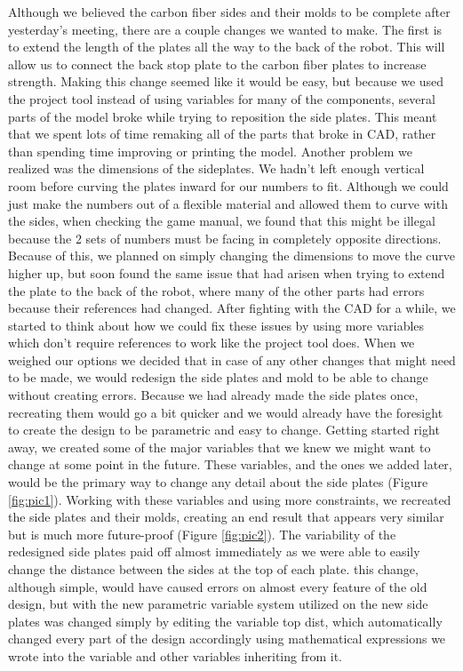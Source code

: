 Although we believed the carbon fiber sides and their molds to be complete after yesterday’s meeting, there are a couple changes we wanted to make. The first is to extend the length of the plates all the way to the back of the robot. This will allow us to connect the back stop plate to the carbon fiber plates to increase strength. Making this change seemed like it would be easy, but because we used the project tool instead of using variables for many of the components, several parts of the model broke while trying to reposition the side plates. This meant that we spent lots of time remaking all of the parts that broke in CAD, rather than spending time improving or printing the model. Another problem we realized was the dimensions of the sideplates. We hadn’t left enough vertical room before curving the plates inward for our numbers to fit. Although we could just make the numbers out of a flexible material and allowed them to curve with the sides, when checking the game manual, we found that this might be illegal because the 2 sets of numbers must be facing in completely opposite directions. Because of this, we planned on simply changing the dimensions to move the curve higher up, but soon found the same issue that had arisen when trying to extend the plate to the back of the robot, where many of the other parts had errors because their references had changed. After fighting with the CAD for a while, we started to think about how we could fix these issues by using more variables which don’t require references to work like the project tool does. When we weighed our options we decided that in case of any other changes that might need to be made, we would redesign the side plates and mold to be able to change without creating errors. Because we had already made the side plates once, recreating them would go a bit quicker and we would already have the foresight to create the design to be parametric and easy to change.
Getting started right away, we created some of the major variables that we knew we might want to change at some point in the future. These variables, and the ones we added later, would be the primary way to change any detail about the side plates (Figure \ref{fig:pic1}). Working with these variables and using more constraints, we recreated the side plates and their molds, creating an end result that appears very similar but is much more future-proof (Figure \ref{fig:pic2}). The variability of the redesigned side plates paid off almost immediately as we were able to easily change the distance between the sides at the top of each plate. this change, although simple, would have caused errors on almost every feature of the old design, but with the new parametric variable system utilized on the new side plates was changed simply by editing the variable top dist, which automatically changed every part of the design accordingly using mathematical expressions we wrote into the variable and other variables inheriting from it.

